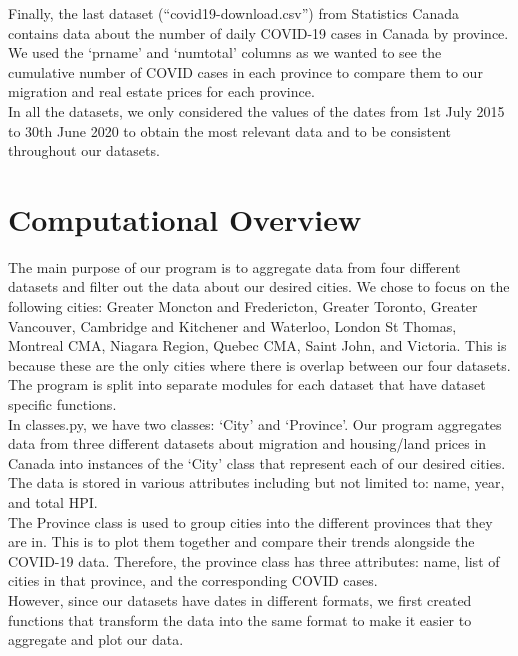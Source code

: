 \documentclass[fontsize=11pt]{article}
\begin{document}
Finally, the last dataset (“covid19-download.csv”) from Statistics Canada contains data about the number of daily COVID-19 cases in Canada by province. We used the ‘prname’ and ‘numtotal’ columns as we wanted to see the cumulative number of COVID cases in each province to compare them to our migration and real estate prices for each province.\\

In all the datasets, we only considered the values of the dates from 1st July 2015 to 30th June 2020 to obtain the most relevant data and to be consistent throughout our datasets.

\newpage

\section{Computational Overview}

The main purpose of our program is to aggregate data from four different datasets and filter out the data about our desired cities. We chose to focus on the following cities: Greater Moncton and Fredericton, Greater Toronto, Greater Vancouver, Cambridge and Kitchener and Waterloo, London St Thomas, Montreal CMA, Niagara Region, Quebec CMA, Saint John, and Victoria. This is because these are the only cities where there is overlap between our four datasets. \\

The program is split into separate modules for each dataset that have dataset specific functions. \\

In classes.py, we have two classes: ‘City’ and ‘Province’. Our program aggregates data from three different datasets about migration and housing/land prices in Canada into instances of the ‘City’ class that represent each of our desired cities. The data is stored in various attributes including but not limited to: name, year, and total HPI. \\

The Province class is used to group cities into the different provinces that they are in. This is to plot them together and compare their trends alongside the COVID-19 data. Therefore, the province class has three attributes: name, list of cities in that province, and the corresponding COVID cases. \\

However, since our datasets have dates in different formats, we first created functions that transform the data into the same format to make it easier to aggregate and plot our data.\\
\end{document}
